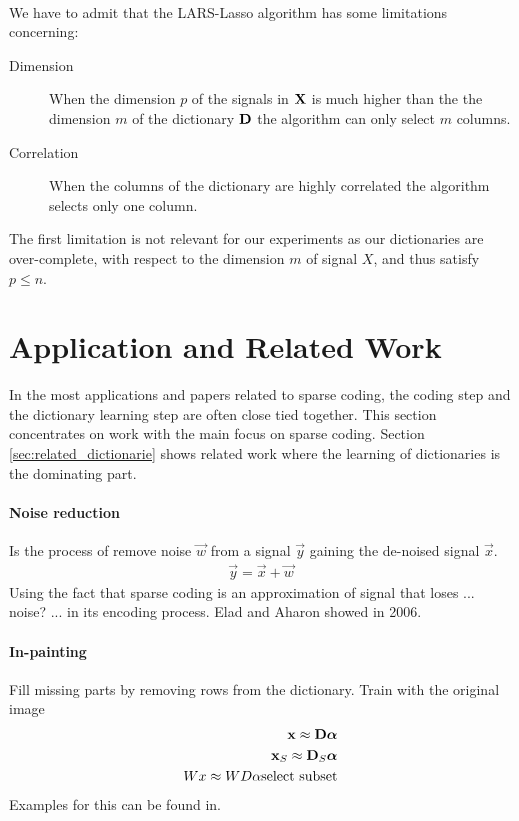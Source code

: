 \paragraph{}
We have to admit that the LARS-Lasso algorithm has some limitations concerning:
\begin{description}
 \item[Dimension] When the dimension $p$ of the signals in $\boldsymbol{\mathrm{X}}$ is much
higher than the the dimension $m$ of the dictionary $\boldsymbol{\mathrm{D}}$ the algorithm can
only select $m$ columns.
  \item[Correlation] When the columns of the dictionary are highly correlated
the algorithm selects only one column.
\end{description}
The first limitation is not relevant for our experiments as our dictionaries
are over-complete, with respect to the dimension $m$ of signal $X$, and thus
satisfy $p\leq n$. 

\section{Application and Related Work}
In the most applications and papers related to sparse coding, the coding
step and the dictionary learning step are often close tied together. This
section concentrates on work with the main focus on sparse coding. Section
\ref{sec:related_dictionarie} shows related work where the learning of
dictionaries is the dominating part.

\paragraph{Noise reduction}
Is the process of remove noise $\vec{w}$ from a signal $\vec{y}$ gaining the
de-noised signal $\vec{x}$.
\begin{align*}
\vec{y} = \vec{x} + \vec{w}
\end{align*}
Using the fact that sparse coding is an approximation of signal that loses ...
noise? ... in its encoding process. 
Elad and Aharon showed in 2006\cite{Elad2006}.

\paragraph{In-painting}
Fill missing parts by removing rows from the dictionary.
Train with the original image
\begin{align*}
\boldsymbol{\mathrm{x}} \approx \boldsymbol{\mathrm{D}}\boldsymbol{\mathrm{\alpha}}\\
\boldsymbol{\mathrm{x}}_S \approx \boldsymbol{\mathrm{D}}_S\boldsymbol{\mathrm{\alpha}}\\
Wx \approx WD\alpha\text{select subset}\\
\end{align*}
Examples for this can be found in\cite{mairal08sparse}.

